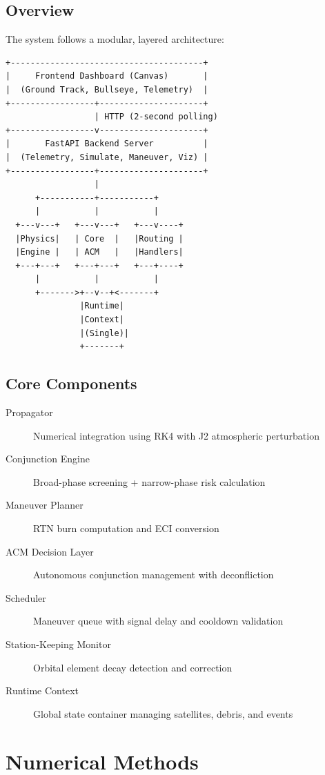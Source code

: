 \documentclass[11pt,a4paper]{article}
\begin{document}
\subsection{Overview}

The system follows a modular, layered architecture:

\begin{verbatim}
+---------------------------------------+
|     Frontend Dashboard (Canvas)       |
|  (Ground Track, Bullseye, Telemetry)  |
+-----------------+---------------------+
                  | HTTP (2-second polling)
+-----------------v---------------------+
|       FastAPI Backend Server          |
|  (Telemetry, Simulate, Maneuver, Viz) |
+-----------------+---------------------+
                  |
      +-----------+-----------+
      |           |           |
  +---v---+   +---v---+   +---v----+
  |Physics|   | Core  |   |Routing |
  |Engine |   | ACM   |   |Handlers|
  +---+---+   +---+---+   +---+----+
      |           |           |
      +------->+--v--+<-------+
               |Runtime|
               |Context|
               |(Single)|
               +-------+
\end{verbatim}

\subsection{Core Components}

\begin{description}
    \item[Propagator] Numerical integration using RK4 with J2 atmospheric perturbation
    \item[Conjunction Engine] Broad-phase screening + narrow-phase risk calculation
    \item[Maneuver Planner] RTN burn computation and ECI conversion
    \item[ACM Decision Layer] Autonomous conjunction management with deconfliction
    \item[Scheduler] Maneuver queue with signal delay and cooldown validation
    \item[Station-Keeping Monitor] Orbital element decay detection and correction
    \item[Runtime Context] Global state container managing satellites, debris, and events
\end{description}

\section{Numerical Methods}
\end{document}
